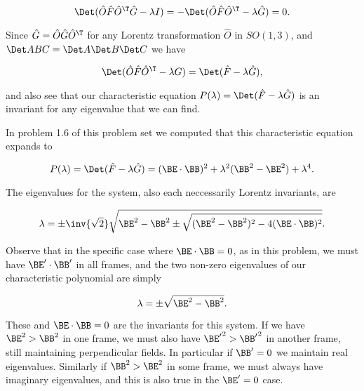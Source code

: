 \begin{equation}\label{eqn:relElectroDynProblemSet3:1600}
\Det (\hat{O} \hat{F} \hat{O}^\T \hat{G} - \lambda I) = -\Det (\hat{O} \hat{F} \hat{O}^\T - \lambda \hat{G}) = 0.
\end{equation}

Since $\hat{G} = \hat{O} \hat{G} \hat{O}^\T$ for any Lorentz transformation $\hat{O}$ in $SO(1,3)$, and $\Det ABC = \Det A \Det B \Det C$ we have

\begin{equation}\label{eqn:relElectroDynProblemSet3:n}
\Det (\hat{O} \hat{F} \hat{O}^\T - \lambda G)
= 
\Det (\hat{F} - \lambda \hat{G}),
\end{equation}

and also see that our characteristic equation $P(\lambda) = \Det (\hat{F} - \lambda \hat{G})$ is an invariant for any eigenvalue that we can find.

In problem 1.6 of this problem set we computed that this characteristic equation expands to

\begin{equation}\label{eqn:relElectroDynProblemSet3:1620}
P(\lambda) = \Det (\hat{F} - \lambda \hat{G}) = (\BE \cdot \BB)^2 + \lambda^2 (\BB^2 - \BE^2) + \lambda^4.
\end{equation}

The eigenvalues for the system, also each neccessarily Lorentz invariants, are

\begin{equation}\label{eqn:relElectroDynProblemSet3:1080b}
\lambda = \pm \inv{\sqrt{2}} \sqrt{ \BE^2 - \BB^2 \pm \sqrt{ (\BE^2 - \BB^2)^2 - 4 (\BE \cdot \BB)^2 }}.
\end{equation}

Observe that in the specific case where $\BE \cdot \BB = 0$, as in this problem, we must have $\BE' \cdot \BB'$ in all frames, and the two non-zero eigenvalues of our characteristic polynomial are simply

\begin{equation}\label{eqn:relElectroDynProblemSet3:1640}
\lambda = \pm \sqrt{\BE^2 - \BB^2}.
\end{equation}

These and $\BE \cdot \BB = 0$ are the invariants for this system.   If we have $\BE^2 > \BB^2$ in one frame, we must also have ${\BE'}^2 > {\BB'}^2$ in another frame, still maintaining perpendicular fields.  In particular if $\BB' = 0$ we maintain real eigenvalues.  Similarly if $\BB^2 > \BE^2$ in some frame, we must always have imaginary eigenvalues, and this is also true in the $\BE' = 0$ case.  

